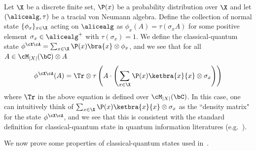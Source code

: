 \begin{example}
	Let $\X$ be a discrete finite set, $\P(x)$ be a probability distribution over $\X$ and let $(\alicealg, \tau)$ be a tracial von Neumann algebra. Define the collection of normal state $\{ \phi_x \}_{x \in \X}$ acting on $\alicealg$ as $\phi_x(A) = \tau(\sigma_x A)$ for some positive element $\sigma_x \in \alicealg^{+}$ with $\tau(\sigma_x) = 1$. We define the classical-quantum state $\phi^{\cX \cA}= \sum_{x \in \X} \P(x)\bra{x} \otimes \phi_x$, and we see that for all $A \in \cM_{|X|}(\bC) \otimes A$
	\begin{equation*}
		\phi^{\cX \cA}(A) = \Tr \otimes \tau\left(A \cdot \left(  \sum_{x \in \X} \P(x)\ketbra{x}{x} \otimes \sigma_x \right)\right)
	\end{equation*}
	where $\Tr$ in the above equation is defined over $\cM_{|X|}(\bC)$. In this case, one can intuitively think of $\sum_{x \in \X} \P(x)\ketbra{x}{x} \otimes \sigma_x$ as the ``density matrix" for the state $\phi^{\cX \cA}$, and we see that this is consistent with the standard definition for classical-quantum state in quantum information literatures (e.g.~\cite[Definition 4.3.5]{wildeQuantumInformationTheory2013}). 
\end{example}

We now prove some properties of classical-quantum states used in~\cite[Section 5.1]{bavarianAnchoredParallelRepetition2021}.

